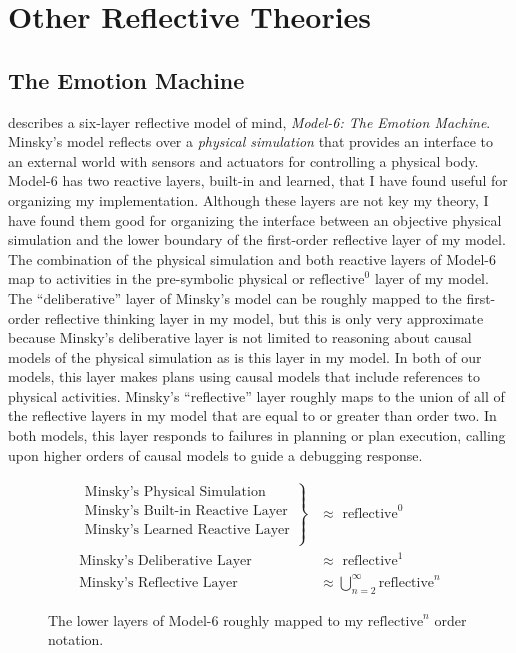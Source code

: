 \chapter{Other Reflective Theories}
\label{chapter:other_reflective_theories}

\section{The Emotion Machine}
\label{backreference:self_reflective_self_conscious}

\cite{minsky:2006} describes a six-layer reflective model of mind,
\emph{\mbox{Model-6}: The Emotion Machine}.  Minsky's model reflects
over a \emph{physical simulation} that provides an interface to an
external world with sensors and actuators for controlling a physical
body.  \mbox{Model-6} has two reactive layers, built-in and learned,
that I have found useful for organizing my implementation.  Although
these layers are not key my theory, I have found them good for
organizing the interface between an objective physical simulation and
the lower boundary of the first-order reflective layer of my model.
The combination of the physical simulation and both reactive layers of
\mbox{Model-6} map to activities in the pre-symbolic physical or
$\text{reflective}^0$ layer of my model.  The ``deliberative'' layer
of Minsky's model can be roughly mapped to the first-order reflective
thinking layer in my model, but this is only very approximate because
Minsky's deliberative layer is not limited to reasoning about causal
models of the physical simulation as is this layer in my model.  In
both of our models, this layer makes plans using causal models that
include references to physical activities.  Minsky's ``reflective''
layer roughly maps to the union of all of the reflective layers in my
model that are equal to or greater than order two.  In both models,
this layer responds to failures in planning or plan execution, calling
upon higher orders of causal models to guide a debugging response.

\begin{figure}[bth]
\begin{align*}
\left.
  \begin{array}{l}
    \text{Minsky's Physical Simulation}\\
    \text{Minsky's Built-in Reactive Layer}\\
    \text{Minsky's Learned Reactive Layer}\\
  \end{array}
\right\}                            &{\approx} \text{ reflective}^0 \\
\text{Minsky's Deliberative Layer } &{\approx} \text{ reflective}^1 \\
\text{Minsky's Reflective Layer }   &{\approx} \bigcup_{n=2}^{\infty}{\text{reflective}^n}
\end{align*}
\caption{The lower layers of Model-6 roughly mapped to my
  $\text{reflective}^n$ order notation.}
\label{figure:model_6_as_reflective_order_notation}
\end{figure}

